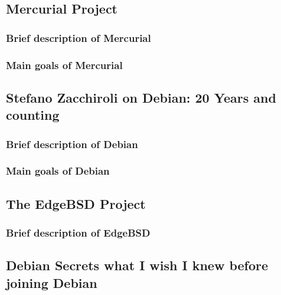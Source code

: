 \documentclass[11pt]{article} %
\begin{document}

\subsection{Mercurial Project}


\subsubsection{Brief description of Mercurial}

\subsubsection{Main goals of Mercurial}


\subsection{Stefano Zacchiroli on Debian: 20 Years and counting}


\subsubsection{Brief description of Debian}

\subsubsection{Main goals of Debian}


\subsection{The EdgeBSD Project}


\subsubsection{Brief description of EdgeBSD}


\subsection{Debian Secrets what I wish I knew before joining Debian}
\end{document}
